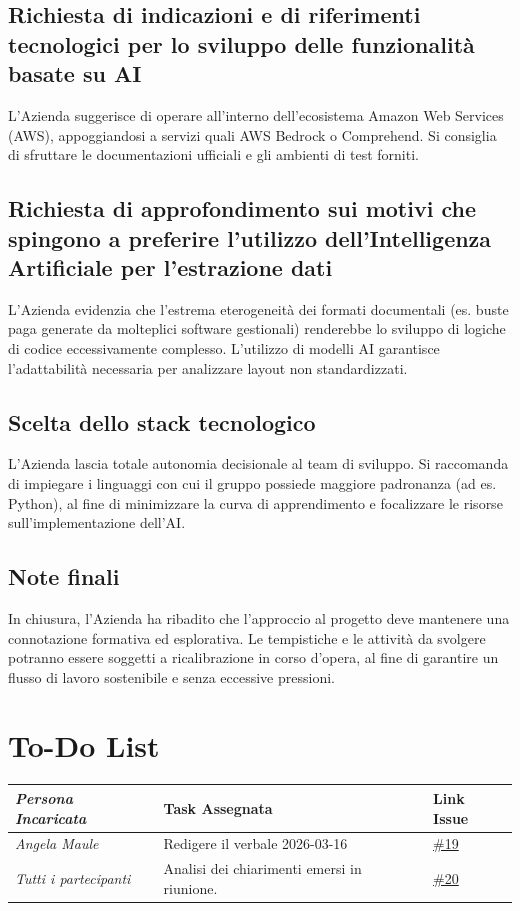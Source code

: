 \documentclass[a4paper,12pt]{article}
\begin{document}
\subsection{Richiesta di indicazioni e di riferimenti tecnologici per lo sviluppo delle funzionalità basate su AI}
L'Azienda suggerisce di operare all'interno dell'ecosistema Amazon Web Services (AWS), appoggiandosi a servizi quali AWS Bedrock o Comprehend. Si consiglia di sfruttare le documentazioni ufficiali e gli ambienti di test forniti.
\subsection{Richiesta di approfondimento sui motivi che spingono a preferire l'utilizzo dell'Intelligenza Artificiale per l'estrazione dati}
L'Azienda evidenzia che l'estrema eterogeneità dei formati documentali (es. buste paga generate da molteplici software gestionali) renderebbe lo sviluppo di logiche di codice eccessivamente complesso. L'utilizzo di modelli AI garantisce l'adattabilità necessaria per analizzare layout non standardizzati.
\subsection{Scelta dello stack tecnologico}
L'Azienda lascia totale autonomia decisionale al team di sviluppo. Si raccomanda di impiegare i linguaggi con cui il gruppo possiede maggiore padronanza (ad es. Python), al fine di minimizzare la curva di apprendimento e focalizzare le risorse sull'implementazione dell'AI.
\subsection{Note finali}
In chiusura, l'Azienda ha ribadito che l'approccio al progetto deve mantenere una connotazione formativa ed esplorativa. Le tempistiche e le attività da svolgere potranno essere soggetti a ricalibrazione in corso d'opera, al fine di garantire un flusso di lavoro sostenibile e senza eccessive pressioni.
\section{To-Do List}
\begin{table}[h]
    \centering
    \begin{tabular}{|l|p{5cm}|l|}
    \hline
        \rowcolor{lightgray}\textit{\textbf{Persona Incaricata}}  & \textbf{Task Assegnata} &\textbf{Link Issue} \\
    \hline
        \textit{Angela Maule} &  Redigere il verbale 2026-03-16 & \href{https://github.com/aLittleByte-19/Documentazione/issues/19}{\#19}\\
    \hline
        \textit{Tutti i partecipanti} & Analisi dei chiarimenti emersi in riunione. & \href{https://github.com/aLittleByte-19/Documentazione/issues/20}{\#20}\\
    \hline
    \end{tabular}
    \label{tab:todo}
\end{table}
\end{document}
